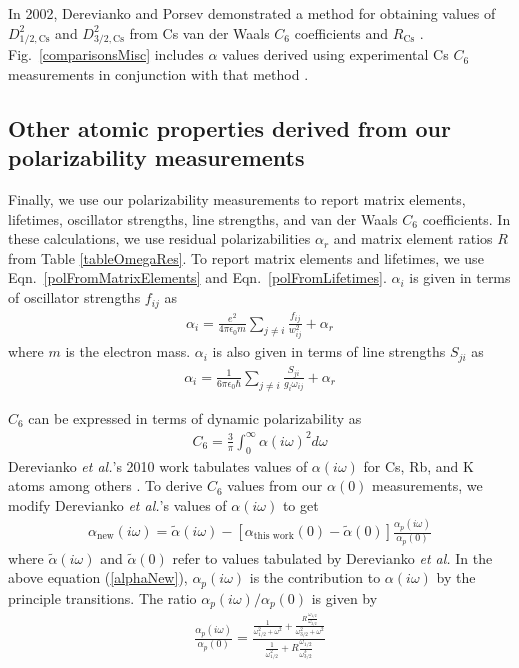 \documentclass[twocolumn,pra,showpacs,superscriptaddress,longbibliography]{revtex4-1}   %
\newcommand{\figref}[1]{Fig.~\ref{#1}}
\newcommand{\eqnref}[1]{Eqn.~\eqref{#1}}
\newcommand{\rcs}{R_{\mathrm{Cs}}}
\newcommand{\etal}{\textit{et al.}}
\newcommand{\etalspace}{\textit{et al. }}
\begin{document}
In 2002, Derevianko and Porsev demonstrated a method for obtaining values of $D_{1/2,\mathrm{Cs}}^2$ and $D_{3/2,\mathrm{Cs}}^2$ from Cs van der Waals $C_6$ coefficients \cite{Derevianko2001} and $\rcs$ \cite{Rafac1998}. \figref{comparisonsMisc} includes $\alpha$ values derived using experimental Cs $C_6$ measurements in conjunction with that method \cite{Leo2000,Chin2004}.



\subsection{Other atomic properties derived from our polarizability measurements} \label{sectionDerivedProperties}

Finally, we use our polarizability measurements to report matrix elements, lifetimes, oscillator strengths, line strengths, and van der Waals $C_6$ coefficients.
In these calculations, we use residual polarizabilities $\alpha_r$ and matrix element ratios $R$ from Table \ref{tableOmegaRes}.
To report matrix elements and lifetimes, we use \eqnref{polFromMatrixElements} and \eqnref{polFromLifetimes}. $\alpha_i$ is given in terms of oscillator strengths $f_{ij}$ as 
\begin{align}
	\alpha_i = \frac{e^2}{4 \pi \epsilon_0 m}
	\sum_{j \neq i}
	\frac{f_{ij}}{w_{ij}^2}
	+ \alpha_r
	\label{polFromOscStr}
\end{align}
where $m$ is the electron mass. 
$\alpha_i$ is also given in terms of line strengths $S_{ji}$ as
\begin{align}
	\alpha_i = \frac{1}{6\pi\epsilon_0\hbar} 
	\sum_{j \neq i} 
	\frac{S_{ji}}{g_i\omega_{ij}}
	+ \alpha_r
	\label{polFromLineStr}
\end{align}


$C_6$ can be expressed in terms of dynamic polarizability as
\begin{align}
	C_6 = \frac{3}{\pi} \int_0^{\infty} \alpha(i\omega)^2 d\omega
	\label{C6fromPol}
\end{align}
Derevianko \etal's 2010 work tabulates values of $\alpha(i\omega)$ for Cs, Rb, and K atoms among others \cite{Derevianko2010}. To derive $C_6$ values from our $\alpha(0)$ measurements, we modify Derevianko \etal's values of $\alpha(i\omega)$ to get
\begin{align}
	\alpha_{\mathrm{new}}(i\omega) =
	\tilde{\alpha}(i\omega) -
	\left[\alpha_{\textrm{this work}}(0) - \tilde{\alpha}(0)\right]
	\frac{\alpha_p(i\omega)}{\alpha_p(0)}
	\label{alphaNew}
\end{align}
where $\tilde{\alpha}(i\omega)$ and $\tilde{\alpha}(0)$ refer to values tabulated by Derevianko \etalspace
In the above equation (\ref{alphaNew}), $\alpha_p(i\omega)$ is the contribution to $\alpha(i\omega)$ by the principle transitions. The ratio $\alpha_p(i\omega)/\alpha_p(0)$ is given by
\begin{align}
	\frac{\alpha_p(i\omega)}{\alpha_p(0)} = \frac
	{
		\frac{1}{\omega_{1/2}^2+\omega^2} + \frac{R\frac{\omega_{1/2}}{\omega_{3/2}}}{\omega_{3/2}^2+\omega^2}
	}
	{
		\frac{1}{\omega_{1/2}^2} + R\frac{\omega_{1/2}}{\omega^3_{3/2}}
	}
	\label{polPRatio}
\end{align}
\end{document}
